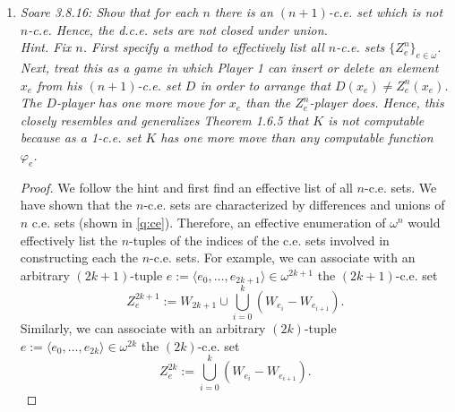 \documentclass{article}
\begin{document}
\begin{enumerate}[label={\bf Q\arabic*:}]
\begin{proof}
      Consider the Turing functional $\Phi_e(x)$ such that given arbitrary
      $X\in2^\omega$ and $x\in\omega$, first computes the set
      $\{a<f(x): X(a)=1\}$, and then the set $\{f(0),\ldots,f(x-1)\}$, and
      returns 1 if the first set is not contained in the second, and
      returns 0 otherwise. Then $\Phi_e$ is total because $f$ is total
      recursive. Also, $D=\Phi_e^A$. Thus from the Truth-table theorem
      (Nerode, Theorem 3.8.5), $D\leq_{tt}A$.
    \end{proof}

  \item \it Soare 3.8.16: Show that for each $n$ there is an $(n+1)$-c.e.
    set which is not $n$-c.e. Hence, the d.c.e. sets are not closed under
    union. \\

    Hint. Fix $n$. First specify a method to effectively list all $n$-c.e.
    sets $\{Z_e^n\}_{e\in\omega}$. Next, treat this as a game in which
    Player 1 can insert or delete an element $x_e$ from his $(n+1)$-c.e.
    set $D$ in order to arrange that $D(x_e)\neq Z_e^n(x_e)$. The
    $D$-player has one more move for $x_e$ than the $Z_e^n$-player does.
    Hence, this closely resembles and generalizes Theorem 1.6.5 that $K$ is
    not computable because as a 1-c.e. set $K$ has one more move than any
    computable function $\varphi_e$.

    \begin{proof}
      We follow the hint and first find an effective list of all $n$-c.e.
      sets. We have shown that the $n$-c.e. sets are characterized by
      differences and unions of $n$ c.e. sets (shown in \ref{q:ce}).
      Therefore, an effective enumeration of $\omega^n$ would effectively
      list the $n$-tuples of the indices of the c.e. sets involved in
      constructing each the $n$-c.e. sets. For example, we can associate
      with an arbitrary $(2k+1)$-tuple $e:=\langle
      e_0,\ldots,e_{2k+1}\rangle\in \omega^{2k+1}$ the $(2k+1)$-c.e. set
      \[Z_{e}^{2k+1} :=W_{2k+1} \cup \bigcup_{i=0}^k (W_{e_i}-W_{e_{i+1}}).\]
      Similarly, we can associate with an arbitrary
      $(2k)$-tuple $e:=\langle e_0,\ldots,e_{2k}\rangle\in
      \omega^{2k}$ the $(2k)$-c.e. set
      \[Z_{e}^{2k} :=\bigcup_{i=0}^k (W_{e_i}-W_{e_{i+1}}).\]


\end{proof}
\end{enumerate}
\end{document}
